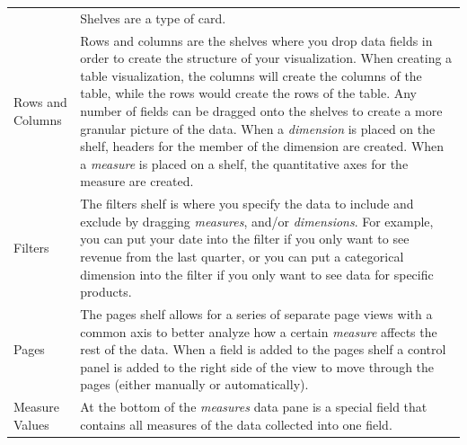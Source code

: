 \documentclass[]{book}
\begin{document}
\begin{longtable}[]{@{}ll@{}}
\begin{minipage}[t]{0.15\columnwidth}
\end{minipage} & \begin{minipage}[t]{0.80\columnwidth}\raggedright
Shelves are a type of card.\strut
\end{minipage}\tabularnewline
\begin{minipage}[t]{0.15\columnwidth}\raggedright
Rows and Columns\strut
\end{minipage} & \begin{minipage}[t]{0.80\columnwidth}\raggedright
Rows and columns are the shelves where you drop data fields in order to create the structure of your visualization. When creating a table visualization, the columns will create the columns of the table, while the rows would create the rows of the table. Any number of fields can be dragged onto the shelves to create a more granular picture of the data. When a \emph{dimension} is placed on the shelf, headers for the member of the dimension are created. When a \emph{measure} is placed on a shelf, the quantitative axes for the measure are created.\strut
\end{minipage}\tabularnewline
\begin{minipage}[t]{0.15\columnwidth}\raggedright
Filters\strut
\end{minipage} & \begin{minipage}[t]{0.80\columnwidth}\raggedright
The filters shelf is where you specify the data to include and exclude by dragging \emph{measures}, and/or \emph{dimensions}. For example, you can put your date into the filter if you only want to see revenue from the last quarter, or you can put a categorical dimension into the filter if you only want to see data for specific products.\strut
\end{minipage}\tabularnewline
\begin{minipage}[t]{0.15\columnwidth}\raggedright
Pages\strut
\end{minipage} & \begin{minipage}[t]{0.80\columnwidth}\raggedright
The pages shelf allows for a series of separate page views with a common axis to better analyze how a certain \emph{measure} affects the rest of the data. When a field is added to the pages shelf a control panel is added to the right side of the view to move through the pages (either manually or automatically).\strut
\end{minipage}\tabularnewline
\begin{minipage}[t]{0.15\columnwidth}\raggedright
Measure Values\strut
\end{minipage} & \begin{minipage}[t]{0.80\columnwidth}\raggedright
At the bottom of the \emph{measures} data pane is a special field that contains all measures of the data collected into one field.\strut
\end{minipage}\tabularnewline
\bottomrule
\end{longtable}
\end{document}
